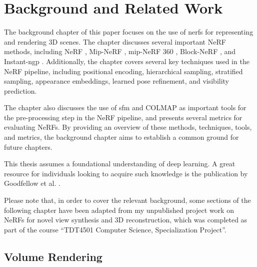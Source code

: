 \chapter{Background and Related Work} \label{chap:relatedwork}

The background chapter of this paper focuses on the use of \acrshort{nerf}s for representing and rendering 3D scenes. The chapter discusses several important NeRF methods, including NeRF \cite{mildenhall_nerf_2020}, Mip-NeRF \cite{barron_mip-nerf_2021}, mip-NeRF 360 \cite{barron_mip-nerf_2022}, Block-NeRF \cite{tancik_block-nerf_2022}, and Instant-ngp \cite{muller_instant_2022}. Additionally, the chapter covers several key techniques used in the NeRF pipeline, including positional encoding, hierarchical sampling, stratified sampling, appearance embeddings, learned pose refinement, and visibility prediction.

The chapter also discusses the use of \acrfull{sfm} and COLMAP \cite{schonberger_structure--motion_2016} as important tools for the pre-processing step in the NeRF pipeline, and presents several metrics for evaluating NeRFs. By providing an overview of these methods, techniques, tools, and metrics, the background chapter aims to establish a common ground for future chapters.

This thesis assumes a foundational understanding of deep learning. A great resource for individuals looking to acquire such knowledge is the publication by Goodfellow et al. \cite{Goodfellow}.

Please note that, in order to cover the relevant background, some sections of the following chapter have been adapted from my unpublished project work on NeRFs for novel view synthesis and 3D reconstruction, which was completed as part of the course “TDT4501 Computer Science, Specialization Project”.

\section{Volume Rendering} \label{sec:volumerendering}

